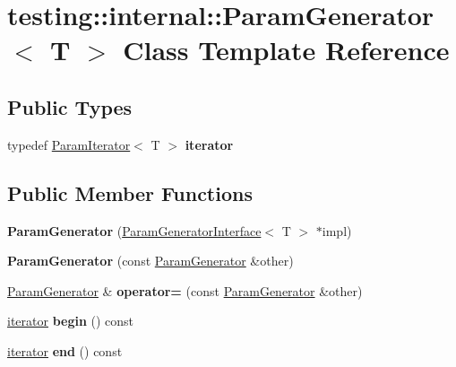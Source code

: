 \hypertarget{classtesting_1_1internal_1_1_param_generator}{}\section{testing\+:\+:internal\+:\+:Param\+Generator$<$ T $>$ Class Template Reference}
\label{classtesting_1_1internal_1_1_param_generator}
\subsection*{Public Types}
\begin{DoxyCompactItemize}
\item 
\mbox{\label{classtesting_1_1internal_1_1_param_generator_a448b08a8eaae1f1d27840d4dbd66c357}} 
typedef \mbox{\hyperlink{classtesting_1_1internal_1_1_param_iterator}{Param\+Iterator}}$<$ T $>$ {\bfseries iterator}
\end{DoxyCompactItemize}
\subsection*{Public Member Functions}
\begin{DoxyCompactItemize}
\item 
\mbox{\label{classtesting_1_1internal_1_1_param_generator_a6b017d4d030927714d495ee95ae92fbc}} 
{\bfseries Param\+Generator} (\mbox{\hyperlink{classtesting_1_1internal_1_1_param_generator_interface}{Param\+Generator\+Interface}}$<$ T $>$ $\ast$impl)
\item 
\mbox{\label{classtesting_1_1internal_1_1_param_generator_a5891d25c31919b3099489f8bbcd58b5e}} 
{\bfseries Param\+Generator} (const \mbox{\hyperlink{classtesting_1_1internal_1_1_param_generator}{Param\+Generator}} \&other)
\item 
\mbox{\label{classtesting_1_1internal_1_1_param_generator_a590a03c6e0a3a3ac6279943ad1f01dc8}} 
\mbox{\hyperlink{classtesting_1_1internal_1_1_param_generator}{Param\+Generator}} \& {\bfseries operator=} (const \mbox{\hyperlink{classtesting_1_1internal_1_1_param_generator}{Param\+Generator}} \&other)
\item 
\mbox{\label{classtesting_1_1internal_1_1_param_generator_a14e735c8bd113556ae905a560cd2d607}} 
\mbox{\hyperlink{classtesting_1_1internal_1_1_param_iterator}{iterator}} {\bfseries begin} () const
\item 
\mbox{\label{classtesting_1_1internal_1_1_param_generator_aaf8f75df1099a07ff771a550b48f9fbe}} 
\mbox{\hyperlink{classtesting_1_1internal_1_1_param_iterator}{iterator}} {\bfseries end} () const
\end{DoxyCompactItemize}
